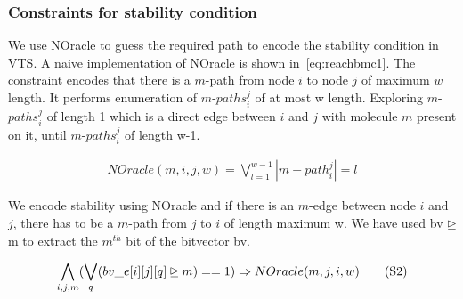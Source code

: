 \subsubsection{Constraints for stability condition}
%
We use NOracle to guess the required path to encode the stability condition in VTS.
%
A naive implementation of NOracle is shown in~\ref{eq:reachbmc1}.
%
The constraint encodes that there is a $m$-path from node $i$ to node $j$ of maximum $w$ length.
%
%
It performs enumeration of $m$-${paths}_i^j$ of at most w length. 
%
Exploring $m$-${paths}_i^j$ of length 1 which is a direct edge between $i$ and $j$ with molecule $m$ present on it, until $m$-${paths}_i^j$ of length w-1.


\begin{align}
NOracle (m, i, j, w) = \bigvee\limits_{l = 1}^{w-1} | {m-path}_i^j | = l
  \tag{S1}\label{eq:reachbmc1}
\end{align}

We encode stability using NOracle and if there is an $m$-edge between node $i$ and $j$, there has to be a $m$-path from $j$ to $i$ of length maximum w.
%
We have used bv $\unrhd$ m to extract the $m^{th}$ bit of the bitvector bv. 

\begin{align}
 \bigwedge\limits_{i,j,m} (\bigvee_{q} (bv\_e[i][j][q] \unrhd m) == 1) \Rightarrow NOracle(m, j, i, w)
  \tag{S2}\label{eq:reachbmc2}
\end{align}

